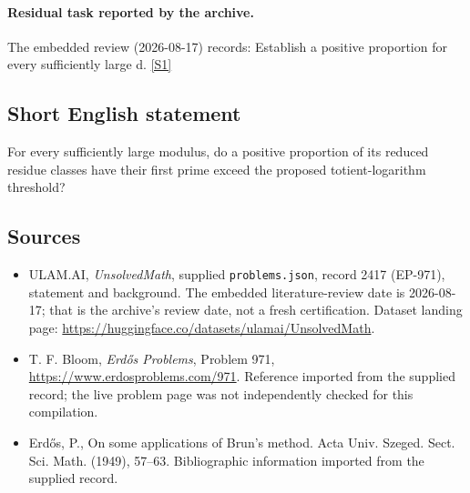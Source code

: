 \documentclass[11pt,a4paper]{article}
\newcommand{\sref}[2]{\hyperlink{source:#1:#2}{[S#2]}}
\begin{document}
\paragraph{Residual task reported by the archive.}

The embedded review (2026-08-17) records: Establish a positive proportion for every sufficiently large d. \sref{2417}{1}

\subsection{Short English statement}

For every sufficiently large modulus, do a positive proportion of its reduced residue classes have their first prime exceed the proposed totient-logarithm threshold?

\subsection{Sources}

{\small

\begin{itemize}

\item[\hypertarget{source:2417:1}{S1}] ULAM.AI, \emph{UnsolvedMath}, supplied \texttt{problems.json}, record 2417 (EP-971), statement and background. The embedded literature-review date is 2026-08-17; that is the archive’s review date, not a fresh certification. Dataset landing page: \url{https://huggingface.co/datasets/ulamai/UnsolvedMath}.

\item[\hypertarget{source:2417:2}{S2}] T. F. Bloom, \emph{Erdős Problems}, Problem 971, \url{https://www.erdosproblems.com/971}. Reference imported from the supplied record; the live problem page was not independently checked for this compilation.

\item[\hypertarget{source:2417:3}{S3}] Erd\H{o}s, P., On some applications of {B}run's method. Acta Univ. Szeged. Sect. Sci. Math. (1949), 57--63. Bibliographic information imported from the supplied record.

\end{itemize}

}

\label{end:2417}
\end{document}
